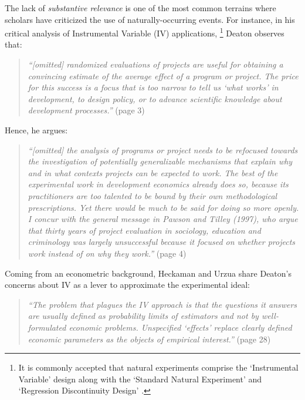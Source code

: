 \documentclass[11pt]{article}
\begin{document}
\begin{refsection}
The lack of \textit{substantive relevance} is one of the most common terrains 
where scholars have criticized the use of naturally-occurring events. For 
instance, in his critical analysis of Instrumental Variable (IV) applications,
\footnote{It is commonly accepted that natural experiments comprise the 
`Instrumental Variable' design along with the `Standard Natural Experiment' 
and `Regression Discontinuity Design' \autocite{sieweke_santoni_2020,dunning_2012}.} 
Deaton \autocite*{deaton_2009} observes that:

\begin{quote}
\textit{
  ``[omitted] randomized evaluations of projects are useful for obtaining a convincing
  estimate of the average effect of a program or project. The price for this
  success is a focus that is too narrow to tell us `what works' in development,
  to design policy, or to advance scientific knowledge about development
  processes.''
  }
  (page 3)
\end{quote}

Hence, he argues:

\begin{quote}
   \textit{
  ``[omitted] the analysis of programs or project needs to be refocused towards
  the investigation of potentially generalizable mechanisms that explain why and
  in what contexts projects can be expected to work. The best of the
  experimental work in development economics already does so, because its
  practitioners are too talented to be bound by their own methodological
  prescriptions. Yet there would be much to be said for doing so more openly. I
  concur with the general message in Pawson and Tilley (1997), who argue that
  thirty years of project evaluation in sociology, education and criminology was
  largely unsuccessful because it focused on whether projects work instead of on
  why they work.''
  }
  (page 4)
\end{quote}

Coming from an econometric background, Heckaman and Urzua
\autocite*{heckman_urzua_2010} share Deaton's concerns about IV as a lever to
approximate the experimental ideal:

\begin{quote}
  \textit{
  ``The problem that plagues the IV approach is that the questions it answers are
  usually defined as probability limits of estimators and not by well-formulated
  economic problems. Unspecified `effects' replace clearly defined economic
  parameters as the objects of empirical interest.''
  }
  (page 28)
\end{quote}


\end{refsection}
\end{document}
